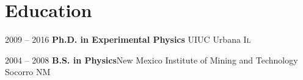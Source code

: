 \section{\textbf{Education}}

\cventry
{2009 -- 2016}
{\textbf{Ph.D. in Experimental Physics}}
{UIUC}
{Urbana}
{\textsc{Il}}{}


\cventry
{2004 -- 2008}
{\textbf{B.S. in Physics}}{New Mexico Institute of Mining and Technology}
{Socorro}
{\textsc{NM}}{}
